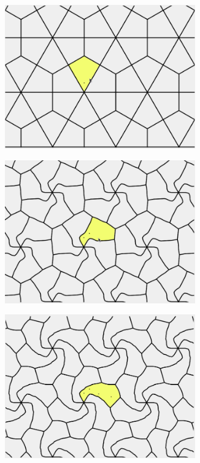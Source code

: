 \documentclass[12pt]{report}
\begin{document}
\begin{figure}[H]

  \begin{subfigure}[b]{0.33\textwidth}
    \includegraphics[width=0.9\textwidth]{sl1.png}

  \end{subfigure}
  \begin{subfigure}[b]{0.33\textwidth}
    \includegraphics[width=0.9\textwidth]{sl2.png}

  \end{subfigure}
  \begin{subfigure}[b]{0.33\textwidth}
    \includegraphics[width=0.9\textwidth]{sl6.png}


\end{subfigure}
\end{figure}
\end{document}
